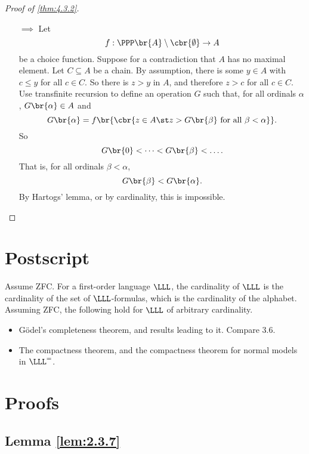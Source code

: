 \begin{proof}[Proof of \ref{thm:4.3.2}]
\hfill
\begin{itemize}
\item[$ \implies $] Let
$$ f : \PPP \br{A} \setminus \cbr{\emptyset} \to A $$
be a choice function. Suppose for a contradiction that $ A $ has no maximal element. Let $ C \subseteq A $ be a chain. By assumption, there is some $ y \in A $ with $ c \le y $ for all $ c \in C $. So there is $ z > y $ in $ A $, and therefore $ z > c $ for all $ c \in C $. Use transfinite recursion to define an operation $ G $ such that, for all ordinals $ \alpha $, $ G\br{\alpha} \in A $ and
$$ G\br{\alpha} = f\br{\cbr{z \in A \st z > G\br{\beta} \ \text{for all} \ \beta < \alpha}}. $$
So
$$ G\br{0} < \dots < G\br{\beta} < \dots. $$
That is, for all ordinals $ \beta < \alpha $,
$$ G\br{\beta} < G\br{\alpha}. $$
By Hartogs' lemma, or by cardinality, this is impossible.
\end{itemize}
\end{proof}

\pagebreak

\section{Postscript}

Assume ZFC. For a first-order language $ \LLL $, the cardinality of $ \LLL $ is the cardinality of the set of $ \LLL $-formulas, which is the cardinality of the alphabet. Assuming ZFC, the following hold for $ \LLL $ of arbitrary cardinality.
\begin{itemize}
\item G\"odel's completeness theorem, and results leading to it. Compare 3.6.
\item The compactness theorem, and the compactness theorem for normal models in $ \LLL^= $.
\end{itemize}

\pagebreak

\appendix

\section{Proofs}

\subsection{Lemma \ref{lem:2.3.7}}

